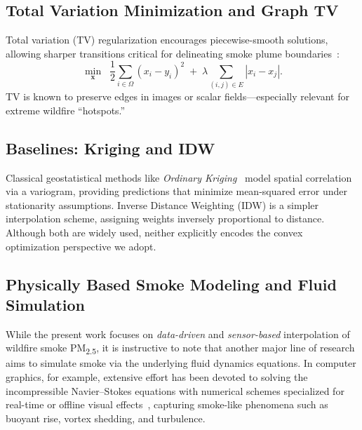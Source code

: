 \documentclass[12pt]{article}                                %
\begin{document}
\subsection{Total Variation Minimization and Graph TV}   %
Total variation (TV) regularization encourages piecewise-smooth solutions, allowing sharper 
transitions critical for delineating smoke plume boundaries~\cite{RudinOsherFatemi}:
\begin{equation}
    \label{eq:tv-smoothing}
    \min_{\mathbf{x}} \;\; \frac12\sum_{i \in \Omega} (x_i - y_i)^2 
    \;+\;\lambda \sum_{(i,j)\in E} |x_i - x_j|.
\end{equation}
TV is known to preserve edges in images or scalar fields—especially relevant for extreme 
wildfire “hotspots.”

\subsection{Baselines: Kriging and IDW}  %
Classical geostatistical methods like \textit{Ordinary Kriging}~\cite{ChilesDelfiner} model 
spatial correlation via a variogram, providing predictions that minimize mean-squared error 
under stationarity assumptions. Inverse Distance Weighting (IDW) is a simpler interpolation 
scheme, assigning weights inversely proportional to distance. Although both are widely used, 
neither explicitly encodes the convex optimization perspective we adopt.

\subsection{Physically Based Smoke Modeling and Fluid Simulation}
\label{subsec:phys-based-smoke}

While the present work focuses on \textit{data-driven} and \textit{sensor-based} interpolation of wildfire smoke PM\textsubscript{2.5}, it is instructive to note that another major line of research aims to simulate smoke via the underlying fluid dynamics equations. In computer graphics, for example, extensive effort has been devoted to solving the incompressible Navier--Stokes equations with numerical schemes specialized for real-time or offline visual effects~\cite{StamStableFluids, Fedkiw2001, FosterMetaxas1997}, capturing smoke-like phenomena such as buoyant rise, vortex shedding, and turbulence. 
\end{document}
